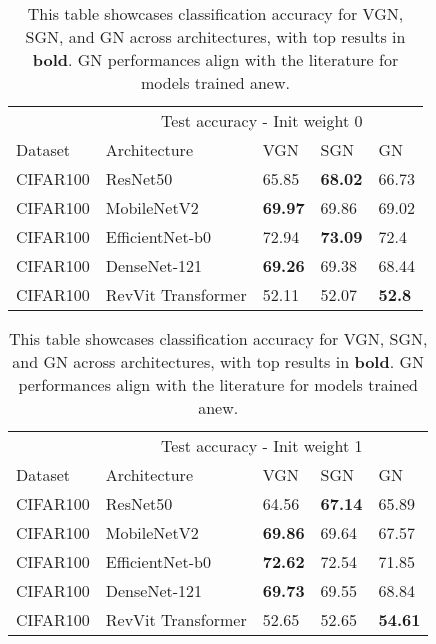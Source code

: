 \begin{table}
  \caption{This table showcases classification accuracy for VGN, SGN, and GN across architectures, with top results in \textbf{bold}. GN performances align with the literature for models trained anew.}
  \label{classification results - Init weight 0}
  \centering
  \begin{tabular}{lllll}
    \toprule
    \multicolumn{4}{r}{Test accuracy - Init weight 0}                   \\
    \cmidrule(r){3-5}
    Dataset     & Architecture     & VGN & SGN & GN \\
    \midrule
    CIFAR100 & ResNet50  & 65.85 & \textbf{68.02} & 66.73    \\
    CIFAR100 & MobileNetV2  & \textbf{69.97} & 69.86 & 69.02 \\
    CIFAR100 & EfficientNet-b0  & 72.94 & \textbf{73.09} & 72.4    \\
    CIFAR100 & DenseNet-121  & \textbf{69.26} & 69.38 & 68.44    \\
    CIFAR100 & RevVit Transformer  & 52.11 & 52.07 & \textbf{52.8}    \\
    \bottomrule
  \end{tabular}
\end{table}

\begin{table}
  \caption{This table showcases classification accuracy for VGN, SGN, and GN across architectures, with top results in \textbf{bold}. GN performances align with the literature for models trained anew.}
  \label{classification results - Init weight 1}
  \centering
  \begin{tabular}{lllll}
    \toprule
    \multicolumn{4}{r}{Test accuracy - Init weight 1}                   \\
    \cmidrule(r){3-5}
    Dataset     & Architecture     & VGN & SGN & GN \\
    \midrule
    CIFAR100 & ResNet50  & 64.56 & \textbf{67.14} & 65.89    \\
    CIFAR100 & MobileNetV2  & \textbf{69.86} & 69.64 & 67.57 \\
    CIFAR100 & EfficientNet-b0  & \textbf{72.62} & 72.54 & 71.85    \\
    CIFAR100 & DenseNet-121  & \textbf{69.73} & 69.55 & 68.84    \\
    CIFAR100 & RevVit Transformer  & 52.65 & 52.65 & \textbf{54.61}    \\
    \bottomrule
  \end{tabular}
\end{table}

